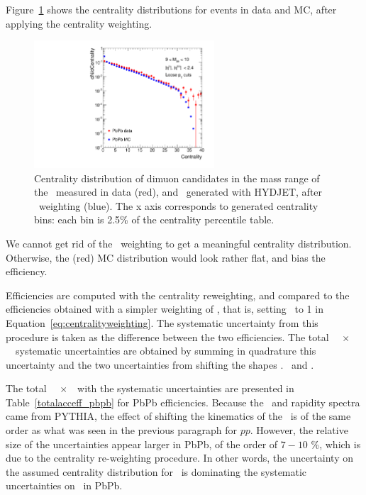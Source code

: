 Figure~\ref{fig:data_mc_cent} shows the centrality distributions for
events in data and MC, after applying the centrality weighting. %

\begin{figure}[h]
\begin{centering}  
  \includegraphics[width=0.6\textwidth]{Chapters/aCorrection/Centrality_PbPb_MC.pdf}
  \caption{Centrality distribution of dimuon candidates in the mass
    range of the \PgU\ measured in data (red), and \PgU\ generated
    with HYDJET, after \Ncoll\ weighting (blue). The x axis
    corresponds to generated centrality bins: each bin is 2.5\% of
    the centrality percentile table.}
  \label{fig:data_mc_cent}
\end{centering}  
\end{figure}
We cannot get rid of the \Ncoll\ weighting to get a
meaningful centrality distribution. Otherwise, the (red) MC
distribution would look rather flat, and bias the efficiency.

Efficiencies are computed with the centrality reweighting, and compared to the
efficiencies obtained with a simpler weighting of \Ncoll, that is,
setting \RAA\ to 1 in Equation~\ref{eq:centralityweighting}. The systematic uncertainty
from this procedure is taken as the difference between the two
efficiencies. The total \PgUa\ \acc~$\times$~\eff\ systematic
uncertainties are obtained by summing in quadrature this uncertainty
and the two uncertainties from
shifting the shapes \vs. \pt\ and \y. 

The total \PgUa\ \acc~$\times$~\eff\ with the systematic uncertainties 
are presented in Table~\ref{totalacceff_pbpb} for PbPb
efficiencies. Because the \pt\ and rapidity spectra came from PYTHIA,
the effect of shifting the kinematics of the \PgU\ is of the same order
as what was seen in the previous paragraph for $pp$. However, the relative size of the
uncertainties appear larger in PbPb, of the order of $7 - 10$ \%, which is due to the
centrality re-weighting procedure. In other words, the uncertainty on
the assumed centrality distribution for \PgU\ is dominating the
systematic uncertainties on \acc\eff\ in PbPb.

